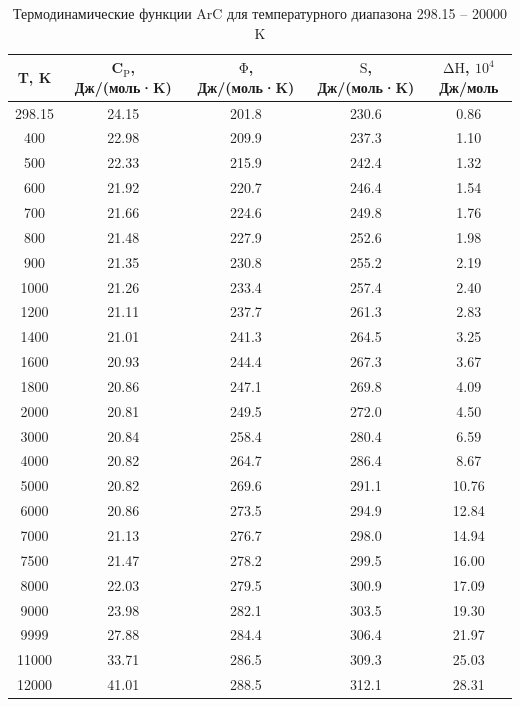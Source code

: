 \documentclass[12pt]{extarticle}
\begin{document}
    \begin{table}[H]
    	\centering
    	\footnotesize
     	\caption{Термодинамические функции ArC для температурного диапазона 298.15 -- 20000 K}
    	\label{tab:thermo2}
    	\begin{tabular}{|c|c|c|c|c|}
    		\hline
    		T, K & C$_{\mathrm{P}}$, Дж/(моль·K) & ${\mathrm{\Phi}}$, Дж/(моль·K) & ${\mathrm{S}}$, Дж/(моль·K) & ${\mathrm{\Delta H}}$, $10^4$ Дж/моль \\ \hline
    		298.15 & 24.15 & 201.8 & 230.6 & 0.86  \\
    		400    & 22.98 & 209.9 & 237.3 & 1.10  \\
    		500    & 22.33 & 215.9 & 242.4 & 1.32  \\
    		600    & 21.92 & 220.7 & 246.4 & 1.54  \\
    		700    & 21.66 & 224.6 & 249.8 & 1.76  \\
    		800    & 21.48 & 227.9 & 252.6 & 1.98  \\
    		900    & 21.35 & 230.8 & 255.2 & 2.19  \\
    		1000   & 21.26 & 233.4 & 257.4 & 2.40  \\
    		1200   & 21.11 & 237.7 & 261.3 & 2.83  \\
    		1400   & 21.01 & 241.3 & 264.5 & 3.25  \\
    		1600   & 20.93 & 244.4 & 267.3 & 3.67  \\
    		1800   & 20.86 & 247.1 & 269.8 & 4.09  \\
    		2000   & 20.81 & 249.5 & 272.0 & 4.50  \\
    		3000   & 20.84 & 258.4 & 280.4 & 6.59  \\
    		4000   & 20.82 & 264.7 & 286.4 & 8.67  \\
    		5000   & 20.82 & 269.6 & 291.1 & 10.76 \\
    		6000   & 20.86 & 273.5 & 294.9 & 12.84 \\
    		7000   & 21.13 & 276.7 & 298.0 & 14.94 \\
    		7500   & 21.47 & 278.2 & 299.5 & 16.00 \\
    		8000   & 22.03 & 279.5 & 300.9 & 17.09 \\
    		9000   & 23.98 & 282.1 & 303.5 & 19.30 \\
    		9999   & 27.88 & 284.4 & 306.4 & 21.97 \\
    		11000  & 33.71 & 286.5 & 309.3 & 25.03 \\
    		12000  & 41.01 & 288.5 & 312.1 & 28.31 \\

\end{tabular}
\end{table}
\end{document}
